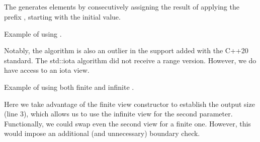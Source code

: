 \subsection{\texorpdfstring{}{\texttt{std::iota}}}

The  generates elements by consecutively assigning the result of applying the prefix , starting with the initial value.


\begin{box-note}
\footnotesize Example of using .
\tcblower
{}
\end{box-note}

Notably, the  algorithm is also an outlier in the support added with the C++20 standard. The std::iota algorithm did not receive a range version. However, we do have access to an iota view.

\begin{box-note}
\footnotesize Example of using both finite and infinite .
\tcblower
{}
\end{box-note}

Here we take advantage of the finite view constructor  to establish the output size (line 3), which allows us to use the infinite view  for the second parameter. Functionally, we could swap even the second view for a finite one. However, this would impose an additional (and unnecessary) boundary check.
